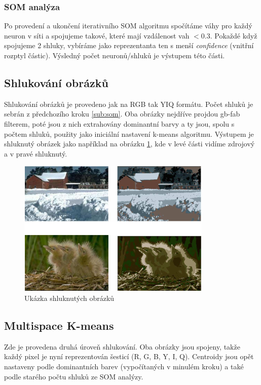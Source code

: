 \documentclass[fleqn,numbers=noenddot,headinclude,%
				11pt,a4paper,footinclude,%
				cleardoublepage=empty,abstractoff %
                ]{scrartcl}
\begin{document}
\subsubsection{SOM analýza}
Po provedení a ukončení iterativního SOM algoritmu spočítáme váhy pro každý neuron v síti a spojujeme takové, které mají vzdálenost vah $<0.3$. Pokaždé když spojujeme 2 shluky, vybíráme jako reprezentanta ten s menší \textit{confidence} (vnitřní rozptyl částic). Výsledný počet neuronů/shluků je výstupem této části.

\subsection{Shlukování obrázků}
\label{sub:kmeans}
Shlukování obrázků je provedeno jak na RGB tak YIQ formátu. Počet shluků je sebrán z předchozího kroku \ref{sub:som}. Oba obrázky nejdříve projdou gb-fab filterem, poté jsou z nich extrahovány dominantní barvy a ty jsou, spolu s počtem shluků, použity jako iniciální nastavení k-means algoritmu. Výstupem je shluknutý obrázek jako například na obrázku \ref{img:clustered}, kde v levé části vidíme zdrojový a v pravé shluknutý.
\begin{figure}[htp]
\centering
\includegraphics[scale=1.00]{imgs/clustered.png}
\caption{Ukázka shluknutých obrázků}
\label{img:clustered}
\end{figure}

\subsection{Multispace K-means}
\label{sub:multi-kmeans}
Zde je provedena druhá úroveň shlukování. Oba obrázky jsou spojeny, takže každý pixel je nyní reprezentován šesticí (R, G, B, Y, I, Q).
Centroidy jsou opět nastaveny podle dominantních barev (vypočítaných v minulém kroku) a také podle starého počtu shluků ze SOM analýzy.
\end{document}
